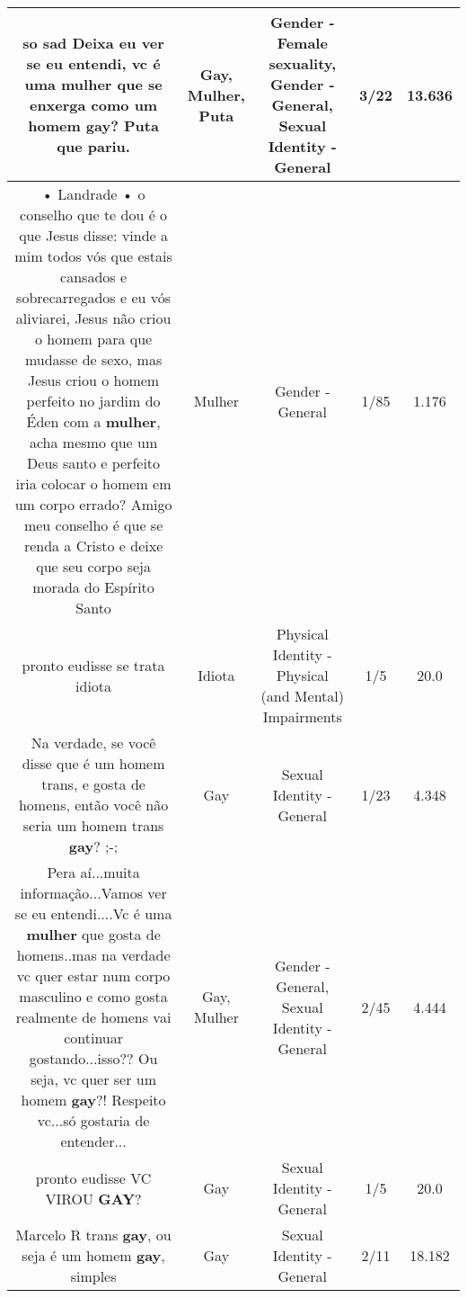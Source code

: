 \documentclass[11pt]{article}
\newlength\mylength
\begin{document}
\begin{center}
\begin{longtable}{|C{.65\mylength}|C{.30\mylength}|C{.12\mylength}|C{.12\mylength}|C{.12\mylength}|}
  \small so sad Deixa eu ver se eu entendi, vc é uma \textbf{mulher} que se enxerga como um homem \textbf{gay}? \textbf{Puta} que pariu.\normalsize   & Gay, Mulher, Puta & Gender - Female sexuality, Gender - General, Sexual Identity - General & 3/22 & 13.636 \\  \hline
  \small • Landrade • o conselho que te dou é o que Jesus  disse: vinde a mim todos vós que estais cansados e sobrecarregados e eu vós aliviarei, Jesus não criou o homem para que mudasse de sexo, mas Jesus criou o homem perfeito no jardim do Éden com a \textbf{mulher}, acha mesmo que um Deus santo e perfeito iria colocar o homem em um corpo errado? Amigo meu conselho é que se renda a Cristo e deixe que seu corpo seja morada do Espírito Santo\normalsize   & Mulher & Gender - General & 1/85 & 1.176 \\  \hline
  \small pronto eudisse se trata idiota\normalsize   & Idiota & Physical Identity - Physical (and Mental) Impairments & 1/5 & 20.0 \\  \hline
  \small Na verdade, se você disse que é um homem trans, e gosta de homens, então você não seria um homem trans \textbf{gay}? ;-;\normalsize   & Gay & Sexual Identity - General & 1/23 & 4.348 \\  \hline
  \small Pera aí...muita informação...Vamos ver se eu entendi....Vc é uma \textbf{mulher} que gosta de homens..mas na verdade vc quer estar num corpo masculino e como gosta realmente de homens vai continuar gostando...isso?? Ou seja, vc quer ser um homem \textbf{gay}?! Respeito vc...só gostaria de entender...\normalsize   & Gay, Mulher & Gender - General, Sexual Identity - General & 2/45 & 4.444 \\  \hline
  \small pronto eudisse VC VIROU \textbf{GAY}?\normalsize   & Gay & Sexual Identity - General & 1/5 & 20.0 \\  \hline
  \small Marcelo R trans \textbf{gay}, ou seja é um homem \textbf{gay}, simples\normalsize   & Gay & Sexual Identity - General & 2/11 & 18.182 \\  \hline

\end{longtable}
\end{center}
\end{document}
